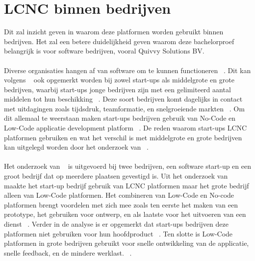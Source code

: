 \section{LCNC binnen bedrijven}
\label{sec:lcnc-bedrijven}
Dit zal inzicht geven in waarom deze platformen worden gebruikt binnen bedrijven. 
Het zal een betere duidelijkheid geven waarom deze bachelorproef belangrijk is voor software bedrijven, vooral Quivvy Solutions BV.
\\
\\
Diverse organisaties hangen af van software om te kunnen functioneren ~\autocite{Hintsch2021}. 
Dit kan volgens ~\textcite{Rafiq_2022} ook opgemerkt worden bij zowel start-ups als middelgrote en grote bedrijven, waarbij start-ups jonge bedrijven 
zijn met een gelimiteerd aantal middelen tot hun beschikking ~\autocite{Rafiq_2022}. Deze soort bedrijven komt dagelijks in contact met uitdagingen zoals tijdsdruk, 
teamformatie, en snelgroeiende markten ~\autocite{Rafiq_2022}. Om dit allemaal te weerstaan maken start-ups bedrijven gebruik van No-Code en Low-Code applicatie 
development platform ~\autocite{Rafiq_2022}. De reden waarom start-ups LCNC platformen gebruiken en wat het verschil is met middelgrote en grote bedrijven kan 
uitgelegd worden door het onderzoek van ~\textcite{Rafiq_2022}.\\\\ Het onderzoek van ~\textcite{Rafiq_2022} is uitgevoerd bij twee bedrijven, een software start-up en 
een groot bedrijf dat op meerdere plaatsen gevestigd is. Uit het onderzoek van ~\textcite{Rafiq_2022} maakte het start-up bedrijf gebruik van LCNC platformen maar 
het grote bedrijf alleen van Low-Code platformen. Het combineren van Low-Code en No-code platformen brengt voordelen met zich mee zoals ten eerste het maken 
van een prototype, het gebruiken voor ontwerp, en als laatste voor het uitvoeren van een dienst ~\autocite{Rafiq_2022}. Verder in de analyse is er opgemerkt dat start-ups 
bedrijven deze platformen niet gebruiken voor hun hoofdproduct ~\autocite{Rafiq_2022}. Ten slotte is Low-Code platformen in grote bedrijven gebruikt voor snelle ontwikkeling 
van de applicatie, snelle feedback, en de mindere werklast. ~\autocite{Rafiq_2022}.
